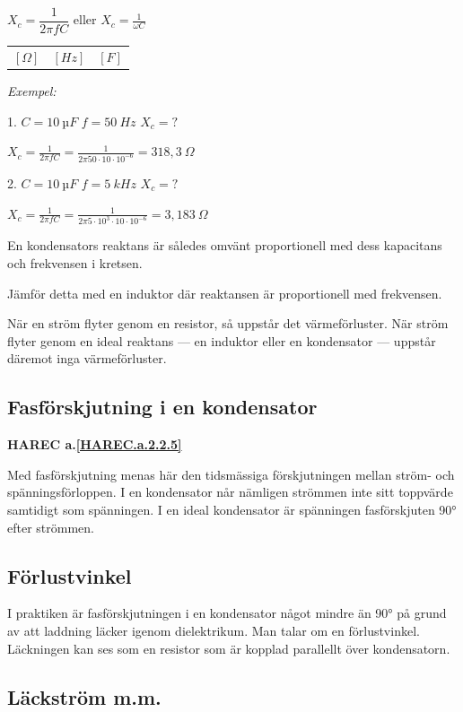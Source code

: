 \(X_c = \dfrac{1}{2πfC}\) eller \(X_c = \frac{1}{\omega C}\)

\begin{tabular}{lll}
 \([\Omega]\) & \([Hz]\) & \([F]\) 
 \end{tabular}

\emph{Exempel:}

1. \(C = 10\ µF\) \(f = 50\ Hz\) \(X_c = ?\)

\(X_c = \frac{1}{2πfC} = \frac{1}{2π 50 \cdot 10 \cdot 10^{-6}} = 318,3\ Ω\)

2. \(C = 10\ µF\) \(f = 5\ kHz\) \(X_c = ?\)

\(X_c = \frac{1}{2πfC} = \frac{1}{2π 5 \cdot 10^3 \cdot 10 \cdot 10^{-6}}
= 3,183\ Ω\)

En kondensators reaktans är således omvänt proportionell med dess kapacitans
och frekvensen i kretsen.

Jämför detta med en induktor där reaktansen är proportionell med frekvensen.

När en ström flyter genom en resistor, så uppstår det värmeförluster. När ström
flyter genom en ideal reaktans --- en induktor eller en kondensator --- uppstår
däremot inga värmeförluster.

\subsection{Fasförskjutning i en kondensator}
\textbf{HAREC a.\ref{HAREC.a.2.2.5}\label{myHAREC.a.2.2.5}}

Med fasförskjutning menas här den tidsmässiga förskjutningen mellan ström- och
spänningsförloppen. I en kondensator når nämligen strömmen inte sitt toppvärde
samtidigt som spänningen. I en ideal kondensator är spänningen fasförskjuten 90°
efter strömmen.

\subsection{Förlustvinkel}

I praktiken är fasförskjutningen i en kondensator något mindre än 90° på grund
av att laddning läcker igenom dielektrikum. Man talar om en förlustvinkel.
Läckningen kan ses som en resistor som är kopplad parallellt över kondensatorn.

\subsection{Läckström m.m.}

